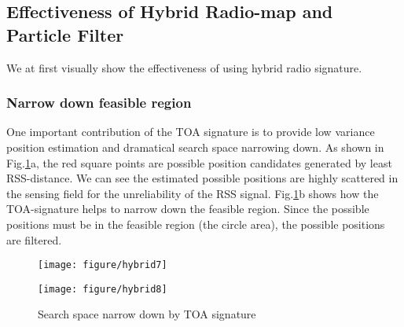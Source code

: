 \documentclass[conference, 10pt]{IEEEtran}
\begin{document}
\subsection{Effectiveness of Hybrid Radio-map and Particle Filter}
We at first visually  show the effectiveness of using hybrid radio signature. 
\subsubsection{Narrow down feasible region} One important contribution of the TOA signature is to provide low variance position estimation and dramatical search space narrowing down.  As shown in Fig.\ref{fig7}a, the red square points are possible position candidates  generated by least RSS-distance. We can see the estimated possible positions are highly scattered in the sensing field for the unreliability of the RSS signal. Fig.\ref{fig7}b shows how the TOA-signature helps to narrow down the feasible region. Since the possible positions must be in the feasible region (the circle area), the possible positions are filtered.   
 \begin{figure}[htbp]
\centering
  \begin{minipage}[t]{0.5\linewidth} 
    \centering 
    \texttt{[image: figure/hybrid7]} 
  \end{minipage}\begin{minipage}[t]{0.5\linewidth} 
    \centering 
    \texttt{[image: figure/hybrid8]} 
  \end{minipage}\caption{Search space narrow down by TOA signature}
    \label{fig7}
\end{figure}
\end{document}
